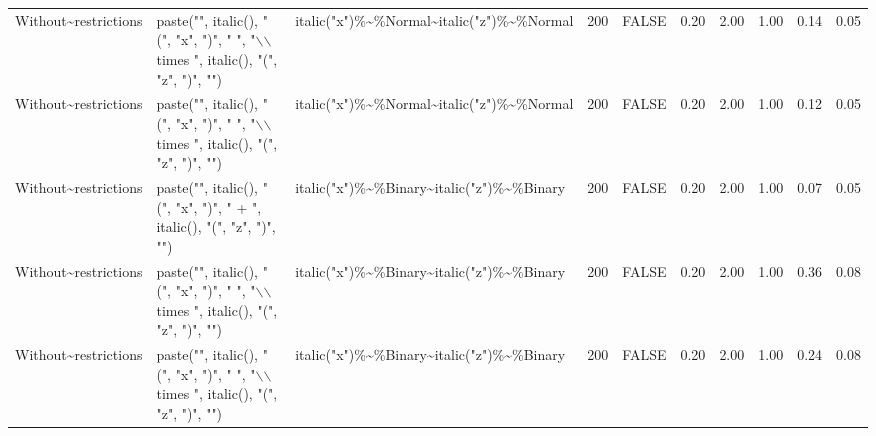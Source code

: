\begin{longtable}{lllrlrrrrr}
  Without\~{}restrictions & paste("", italic(), "(", "x", ")", " ", "$\backslash$$\backslash$times ", italic(), "(", "z", ")", "") & italic("x")\%\~{}\%Normal\~{}italic("z")\%\~{}\%Normal & 200 & FALSE & 0.20 & 2.00 & 1.00 & 0.14 & 0.05 \\ 
  Without\~{}restrictions & paste("", italic(), "(", "x", ")", " ", "$\backslash$$\backslash$times ", italic(), "(", "z", ")", "") & italic("x")\%\~{}\%Normal\~{}italic("z")\%\~{}\%Normal & 200 & FALSE & 0.20 & 2.00 & 1.00 & 0.12 & 0.05 \\ 
  Without\~{}restrictions & paste("", italic(), "(", "x", ")", " + ", italic(), "(", "z", ")", "") & italic("x")\%\~{}\%Binary\~{}italic("z")\%\~{}\%Binary & 200 & FALSE & 0.20 & 2.00 & 1.00 & 0.07 & 0.05 \\ 
  Without\~{}restrictions & paste("", italic(), "(", "x", ")", " ", "$\backslash$$\backslash$times ", italic(), "(", "z", ")", "") & italic("x")\%\~{}\%Binary\~{}italic("z")\%\~{}\%Binary & 200 & FALSE & 0.20 & 2.00 & 1.00 & 0.36 & 0.08 \\ 
  Without\~{}restrictions & paste("", italic(), "(", "x", ")", " ", "$\backslash$$\backslash$times ", italic(), "(", "z", ")", "") & italic("x")\%\~{}\%Binary\~{}italic("z")\%\~{}\%Binary & 200 & FALSE & 0.20 & 2.00 & 1.00 & 0.24 & 0.08 \\ 
   \hline
\hline
\end{longtable}
